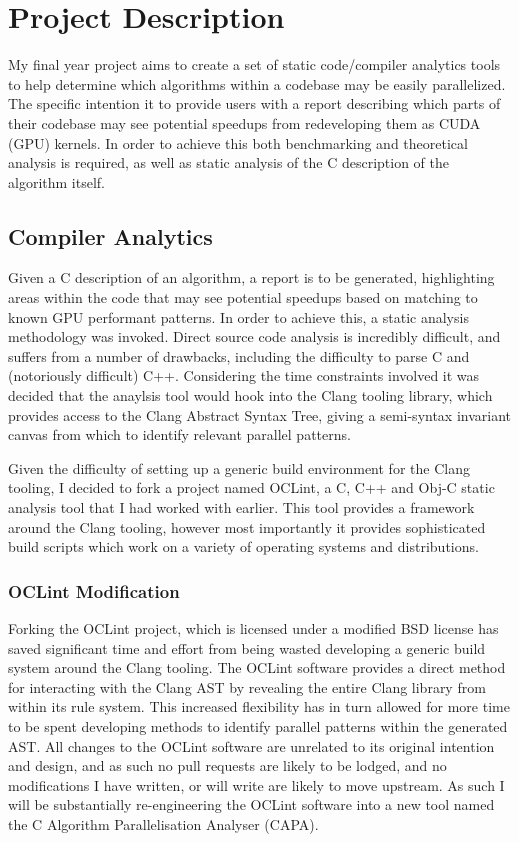 
\section{Project Description}
My final year project aims to create a set of static code/compiler analytics tools to help determine which algorithms within a codebase may be easily parallelized. The specific intention it to provide users with a report describing which parts of their codebase may see potential speedups from redeveloping them as CUDA (GPU) kernels. In order to achieve this both benchmarking and theoretical analysis is required, as well as static analysis of the C description of the algorithm itself.

\subsection{Compiler Analytics}
Given a C description of an algorithm, a report is to be generated, highlighting areas within the code that may see potential speedups based on matching to known GPU performant patterns. In order to achieve this, a static analysis methodology was invoked. Direct source code analysis is incredibly difficult, and suffers from a number of drawbacks, including the difficulty to parse C and (notoriously difficult) C++. Considering the time constraints involved it was decided that the anaylsis tool would hook into the Clang tooling library, which provides access to the Clang Abstract Syntax Tree, giving a semi-syntax invariant canvas from which to identify relevant parallel patterns.

Given the difficulty of setting up a generic build environment for the Clang tooling, I decided to fork a project named OCLint, a C, C++ and Obj-C static analysis tool that I had worked with earlier. This tool provides a framework around the Clang tooling, however most importantly it provides sophisticated build scripts which work on a variety of operating systems and distributions.

\subsubsection{OCLint Modification}
Forking the OCLint project, which is licensed under a modified BSD license has saved significant time and effort from being wasted developing a generic build system around the Clang tooling. The OCLint software provides a direct method for interacting with the Clang AST by revealing the entire Clang library from within its rule system. This increased flexibility has in turn allowed for more time to be spent developing methods to identify parallel patterns within the generated AST. All changes to the OCLint software are unrelated to its original intention and design, and as such no pull requests are likely to be lodged, and no modifications I have written, or will write are likely to move upstream. As such I will be substantially re-engineering the OCLint software into a new tool named the C Algorithm Parallelisation Analyser (CAPA).

